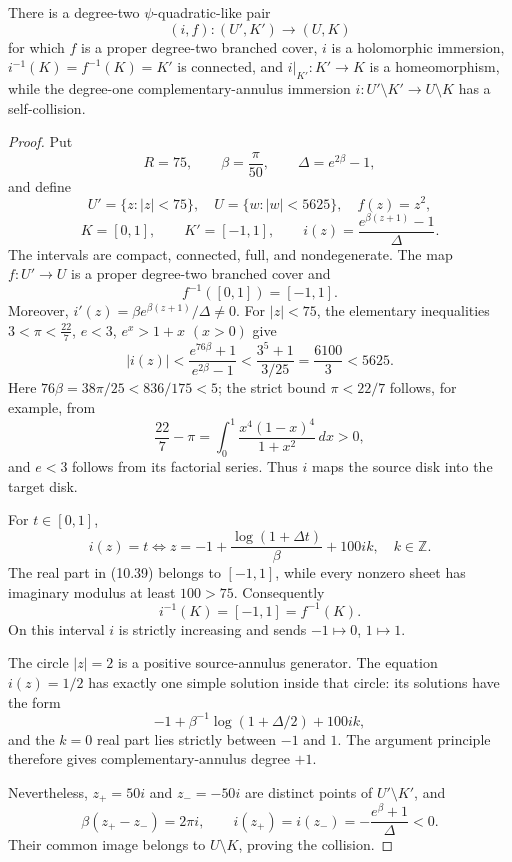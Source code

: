 \begin{theorem}\label{thm:psi-ql-no-go}
There is a degree-two \(\psi\)-quadratic-like pair
\[
(i,f):(U',K')\longrightarrow(U,K)
\]
for which \(f\) is a proper degree-two branched cover, \(i\) is a holomorphic immersion,
\(i^{-1}(K)=f^{-1}(K)=K'\)
is connected, and \(i|_{K'}:K'\to K\) is a homeomorphism, while the degree-one complementary-annulus immersion
\(i:U'\setminus K'\to U\setminus K\)
has a self-collision.
\end{theorem}

\begin{proof}
Put
\[
R=75,\qquad\beta=\frac{\pi}{50},\qquad\Delta=e^{2\beta}-1,
\]
and define
\[
U'=\{z:|z|<75\},\quad U=\{w:|w|<5625\},\quad f(z)=z^2,
\]
\[
K=[0,1],\qquad K'=[-1,1],\qquad i(z)=\frac{e^{\beta(z+1)}-1}{\Delta}. \tag{10.36}
\]
The intervals are compact, connected, full, and nondegenerate. The map \(f:U'\to U\) is a proper degree-two branched cover and
\[
f^{-1}([0,1])=[-1,1]. \tag{10.37}
\]
Moreover, \(i'(z)=\beta e^{\beta(z+1)}/\Delta\neq 0\). For \(|z|<75\), the elementary inequalities \(3<\pi<\tfrac{22}{7}\), \(e<3\), \(e^{x}>1+x\) \((x>0)\) give
\[
|i(z)|<\frac{e^{76\beta}+1}{e^{2\beta}-1}<\frac{3^{5}+1}{3/25}=\frac{6100}{3}<5625. \tag{10.38}
\]
Here \(76\beta=38\pi/25<836/175<5\); the strict bound \(\pi<22/7\) follows, for example, from
\[
\frac{22}{7}-\pi=\int_0^1\frac{x^4(1-x)^4}{1+x^2}\,dx>0,
\]
and \(e<3\) follows from its factorial series. Thus \(i\) maps the source disk into the target disk.

For \(t\in[0,1]\),
\[
i(z)=t\iff z=-1+\frac{\log(1+\Delta t)}{\beta}+100ik,\quad k\in\mathbb Z. \tag{10.39}
\]
The real part in (10.39) belongs to \([-1,1]\), while every nonzero sheet has imaginary modulus at least \(100>75\). Consequently
\[
i^{-1}(K)=[-1,1]=f^{-1}(K).
\]
On this interval \(i\) is strictly increasing and sends \(-1\mapsto 0\), \(1\mapsto 1\).

The circle \(|z|=2\) is a positive source-annulus generator. The equation \(i(z)=1/2\) has exactly one simple solution inside that circle: its solutions have the form
\[
-1+\beta^{-1}\log(1+\Delta/2)+100ik,
\]
and the \(k=0\) real part lies strictly between \(-1\) and \(1\). The argument principle therefore gives complementary-annulus degree \(+1\).

Nevertheless, \(z_+=50i\) and \(z_-=-50i\) are distinct points of \(U'\setminus K'\), and
\[
\beta(z_+-z_-)=2\pi i,\qquad i(z_+)=i(z_-)=-\frac{e^{\beta}+1}{\Delta}<0 .
\]
Their common image belongs to \(U\setminus K\), proving the collision.
\end{proof}